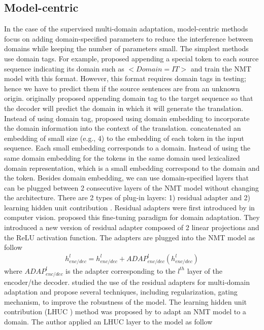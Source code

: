 \subsection{Model-centric}
In the case of the supervised multi-domain adaptation, model-centric methods focus on adding domain-specified parameters to reduce the interference between domains while keeping the number of parameters small. The simplest methods use domain tags. For example, \citet{Kobus17domain} proposed appending a special token to each source sequence indicating its domain such as $<Domain=IT>$ and train the NMT model with this format. However, this format requires domain tags in testing; hence we have to predict them if the source sentences are from an unknown origin. \cite{Britz17effective} originally proposed appending domain tag to the target sequence so that the decoder will predict the domain in which it will generate the translation. Instead of using domain tag, \citep{Kobus17domain, Pham19generic} proposed using domain embedding to incorporate the domain information into the context of the translation. \citet{Kobus17domain} concatenated an embedding of small size (e.g., 4) to the embedding of each token in the input sequence. Each small embedding corresponds to a domain. Instead of using the same domain embedding for the tokens in the same domain \citet{Pham19generic} used lexicalized domain representation, which is a small embedding correspond to the domain and the token. Besides domain embedding, we can use domain-specified layers that can be plugged between 2 consecutive layers of the NMT model without changing the architecture. There are 2 types of plug-in layers: 1) residual adapter \citep{Bapna19simple, Pham20Study} and 2) learning hidden unit contribution \citep{Vilar18learning}. Residual adapters were first introduced by \citet{Rebuffi17learning} in computer vision. \citet{Bapna19simple} proposed this fine-tuning paradigm for domain adaptation. They introduced a new version of residual adapter composed of 2 linear projections and the ReLU activation function. The adapters are plugged into the NMT model as follow
\begin{equation}
\begin{array}{rcl}
h_{enc/dec}^l = h_{enc/dec}^{l} + ADAP_{enc/dec}^l(h_{enc/dec}^{l})
\end{array}
\end{equation}
where $ADAP_{enc/dec}^l$ is the adapter corresponding to the $l^{th}$ layer of the encoder/the decoder. \cite{Pham20Study} studied the use of the residual adapters for multi-domain adaptation and propose several techniques, including regularization, gating mechanism, to improve the robustness of the model. The learning hidden unit contribution (LHUC ) method was proposed by \cite{Vilar18learning} to adapt an NMT model to a domain. The author applied an LHUC layer to the model as follow
